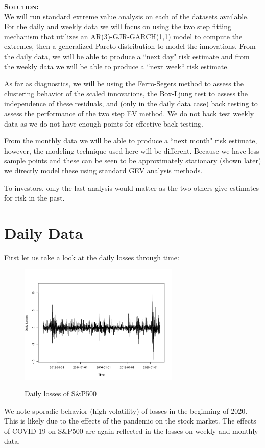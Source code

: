 \documentclass[12pt,oneside]{article}
\newenvironment{solution}
    {\textbf{\textsc{Solution:}}\\}
    {\newpage}
\begin{document}
\begin{solution}
We will run standard extreme value analysis on each of the datasets available. For the daily and weekly data we will focus on using the two step fitting mechanism that utilizes an AR(3)-GJR-GARCH(1,1) model to compute the extremes, then a generalized Pareto distribution to model the innovations. From the daily data, we will be able to produce a ``next day" risk estimate and from the weekly data we will be able to produce a ``next week`` risk estimate.


As far as diagnostics, we will be using the Ferro-Segers method to assess the clustering behavior of the scaled innovations, the Box-Ljung test to assess the independence of these residuals, and (only in the daily data case) back testing to assess the performance of the two step EV method. We do not back test weekly data as we do not have enough points for effective back testing.

From the monthly data we will be able to produce a ``next month" risk estimate, however, the modeling technique used here will be different. Because we have less sample points and these can be seen to be approximately stationary (shown later) we directly model these using standard GEV analysis methods.

To investors, only the last analysis would matter as the two others give estimates for risk in the past.


\section*{Daily Data}
First let us take a look at the daily losses through time:
\begin{figure}[H]
\begin{center}
{\includegraphics[width=3in]{Assignments/a4/day-data.png}}
\caption{Daily losses of S\&P500 }
\end{center}
\end{figure}
We note sporadic behavior (high volatility) of losses in the beginning of 2020. This is likely due to the effects of the pandemic on the stock market. The effects of COVID-19 on S\&P500 are again reflected in the losses on weekly and monthly data. 


\end{solution}
\end{document}
